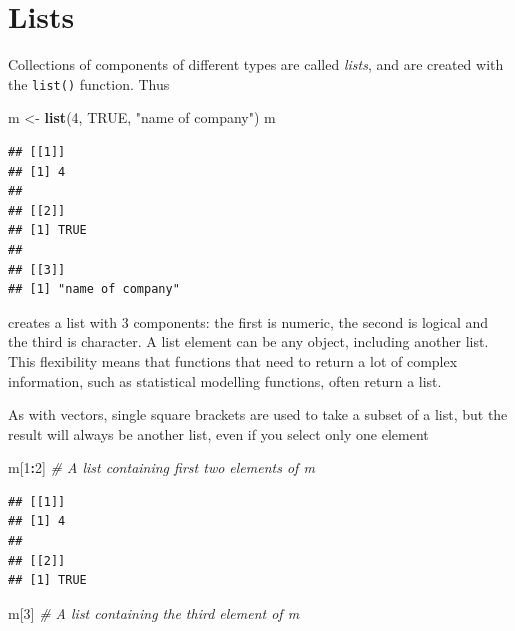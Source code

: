 \documentclass[
]{book}
\newenvironment{Shaded}{\begin{snugshade}}{\end{snugshade}}
\newcommand{\CommentTok}[1]{\textcolor[rgb]{0.56,0.35,0.01}{\textit{#1}}}
\newcommand{\ConstantTok}[1]{\textcolor[rgb]{0.56,0.35,0.01}{#1}}
\newcommand{\DecValTok}[1]{\textcolor[rgb]{0.00,0.00,0.81}{#1}}
\newcommand{\FunctionTok}[1]{\textcolor[rgb]{0.13,0.29,0.53}{\textbf{#1}}}
\newcommand{\NormalTok}[1]{#1}
\newcommand{\OtherTok}[1]{\textcolor[rgb]{0.56,0.35,0.01}{#1}}
\newcommand{\SpecialCharTok}[1]{\textcolor[rgb]{0.81,0.36,0.00}{\textbf{#1}}}
\newcommand{\StringTok}[1]{\textcolor[rgb]{0.31,0.60,0.02}{#1}}
\begin{document}
\section{Lists}\label{lists}

Collections of components of different types are called \emph{lists},
and are created with the \texttt{list()} function. Thus

\begin{Shaded}
\begin{Highlighting}[]
\NormalTok{m }\OtherTok{\textless{}{-}} \FunctionTok{list}\NormalTok{(}\DecValTok{4}\NormalTok{, }\ConstantTok{TRUE}\NormalTok{, }\StringTok{"name of company"}\NormalTok{)}
\NormalTok{m}
\end{Highlighting}
\end{Shaded}

\begin{verbatim}
## [[1]]
## [1] 4
## 
## [[2]]
## [1] TRUE
## 
## [[3]]
## [1] "name of company"
\end{verbatim}

creates a list with 3 components: the first is numeric, the second
is logical and the third is character. A list element can be any
object, including another list. This flexibility means that functions
that need to return a lot of complex information, such as statistical
modelling functions, often return a list.

As with vectors, single square brackets are used to take a subset of a
list, but the result will always be another list, even if you select
only one element

\begin{Shaded}
\begin{Highlighting}[]
\NormalTok{m[}\DecValTok{1}\SpecialCharTok{:}\DecValTok{2}\NormalTok{] }\CommentTok{\# A list containing first two elements of m}
\end{Highlighting}
\end{Shaded}

\begin{verbatim}
## [[1]]
## [1] 4
## 
## [[2]]
## [1] TRUE
\end{verbatim}

\begin{Shaded}
\begin{Highlighting}[]
\NormalTok{m[}\DecValTok{3}\NormalTok{] }\CommentTok{\# A list containing the third element of m}
\end{Highlighting}
\end{Shaded}
\end{document}
